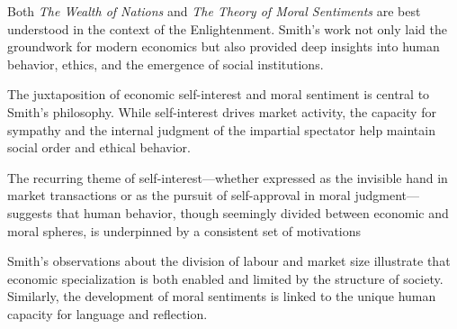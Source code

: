     \begin{remark}
        Both \textit{The Wealth of Nations} and \textit{The Theory of Moral Sentiments} are best understood in the context of the Enlightenment. Smith’s work not only laid the groundwork for modern economics but also provided deep insights into human behavior, ethics, and the emergence of social institutions.
    \end{remark}

    \begin{remark}
        The juxtaposition of economic self-interest and moral sentiment is central to Smith’s philosophy. While self-interest drives market activity, the capacity for sympathy and the internal judgment of the impartial spectator help maintain social order and ethical behavior.
    \end{remark}

    \begin{remark}
        The recurring theme of self-interest—whether expressed as the invisible hand in market transactions or as the pursuit of self-approval in moral judgment—suggests that human behavior, though seemingly divided between economic and moral spheres, is underpinned by a consistent set of motivations
    \end{remark}

    \begin{remark}
        Smith’s observations about the division of labour and market size illustrate that economic specialization is both enabled and limited by the structure of society. Similarly, the development of moral sentiments is linked to the unique human capacity for language and reflection.
    \end{remark}